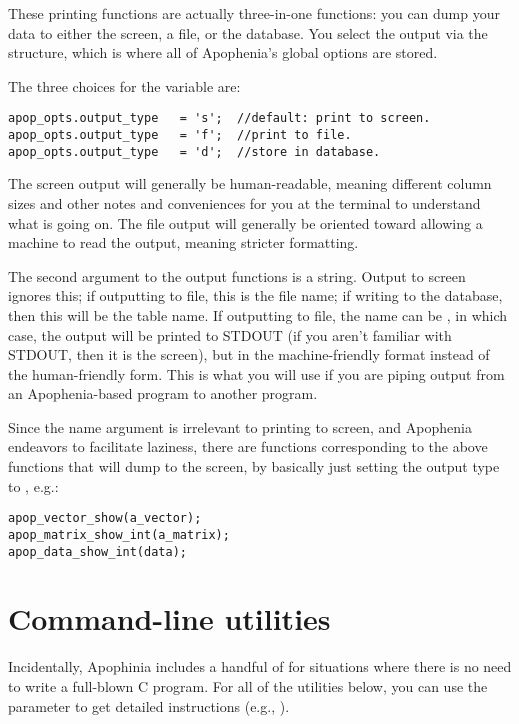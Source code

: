 These printing functions are actually three-in-one functions: you can
dump your data to either the screen, a file, or the database. You select
the output via the  structure, which is where all of
Apophenia's global options are stored. 

The three choices for the  
variable are:
\begin{lstlisting}
apop_opts.output_type   = 's';  //default: print to screen.
apop_opts.output_type   = 'f';  //print to file.
apop_opts.output_type   = 'd';  //store in database.
\end{lstlisting}

The screen output will generally be human-readable, meaning different
column sizes and other notes and conveniences for you at the terminal to
understand what is going on.
The file output will generally be oriented toward allowing a machine to
read the output, meaning stricter formatting. 

The second argument to the output functions is a string.  Output to
screen ignores this; if outputting to file, this is the file name;
if writing to the database, then this will be the table name.
If outputting to file, the name can be , in which case, the
output will be printed to STDOUT (if you aren't familiar with STDOUT,
then it is the screen), but in the machine-friendly format instead of
the human-friendly form. This is what you will use if you are piping
output from an Apophenia-based program to another program.

Since the name argument is irrelevant to printing to screen, and
Apophenia endeavors to facilitate laziness, there are functions
corresponding to the above  functions that will
dump to the screen, by basically just setting the output type to , e.g.:
 
 
 
 
\begin{lstlisting}
apop_vector_show(a_vector);
apop_matrix_show_int(a_matrix);
apop_data_show_int(data);
\end{lstlisting}

\section{Command-line utilities}
Incidentally, Apophinia includes a handful of  for
situations where there is no need to write a full-blown C program. For
all of the utilities below, you can use the  parameter to
get detailed instructions (e.g., ).

